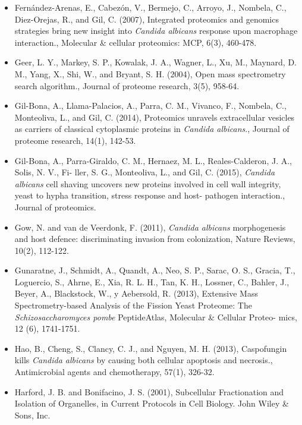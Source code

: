 \begin{itemize}[leftmargin=*]
\item[]{%
Fern\'andez-Arenas, E., Cabez\'on, V., Bermejo, C., Arroyo, J., Nombela, C., Diez-Orejas, R.,
and Gil, C. (2007), Integrated proteomics and genomics strategies bring new insight into
\textit{Candida albicans} response upon macrophage interaction., 
Molecular \& cellular proteomics: MCP, 6(3), 460-478.
}

\item[]{%
Geer, L. Y., Markey, S. P., Kowalak, J. A., Wagner, L., Xu, M., Maynard, D. M., Yang, X., Shi, W.,
and Bryant, S. H. (2004), Open mass spectrometry search algorithm., Journal of proteome
research, 3(5), 958-64.
}

\item[]{%
Gil-Bona, A., Llama-Palacios, A., Parra, C. M., Vivanco, F., Nombela, C., Monteoliva, L., and
Gil, C. (2014), Proteomics unravels extracellular vesicles as carriers of classical cytoplasmic
proteins in \textit{Candida albicans}., Journal of proteome research, 14(1), 142-53.
}

\item[]{%
Gil-Bona, A., Parra-Giraldo, C. M., Hernaez, M. L., Reales-Calderon, J. A., Solis, N. V., Fi-
ller, S. G., Monteoliva, L., and Gil, C. (2015), \textit{Candida albicans} cell shaving uncovers new
proteins involved in cell wall integrity, yeast to hypha transition, stress response and host-
pathogen interaction., Journal of proteomics.
}


\item[]{%
Gow, N. and van de Veerdonk, F. (2011), \textit{Candida albicans} morphogenesis and host defence:
discriminating invasion from colonization, Nature Reviews, 10(2), 112-122.
}

\item[]{
Gunaratne, J., Schmidt, A., Quandt, A., Neo, S. P., Sarac, O. S., Gracia, T., Loguercio, S.,
Ahrne, E., Xia, R. L. H., Tan, K. H., Lossner, C., Bahler, J., Beyer, A., Blackstock, W., y
Aebersold, R. (2013), Extensive Mass Spectrometry-based Analysis of the Fission Yeast
Proteome: The \textit{Schizosaccharomyces pombe} PeptideAtlas, Molecular \& Cellular Proteo-
mics, 12 (6), 1741-1751.
}

\item[]{%
Hao, B., Cheng, S., Clancy, C. J., and Nguyen, M. H. (2013), Caspofungin kills 
\textit{Candida albicans} by causing both cellular apoptosis and necrosis.,
Antimicrobial agents and chemotherapy, 57(1), 326-32.
}

\item[]{%
Harford, J. B. and Bonifacino, J. S. (2001), 
Subcellular Fractionation and Isolation of Organelles,
in Current Protocols in Cell Biology. John Wiley \& Sons, Inc.
}


\end{itemize}
